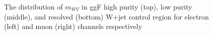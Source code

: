 \begin{figure}[ht]
	\caption{The distribution of $m_{WV}$ in ggF high purity (top), low purity (middle), and resolved (bottom) W+jet control region for electron (left) and muon (right) channels respectively}
	\label{Fig:ggFWR}
\end{figure}




